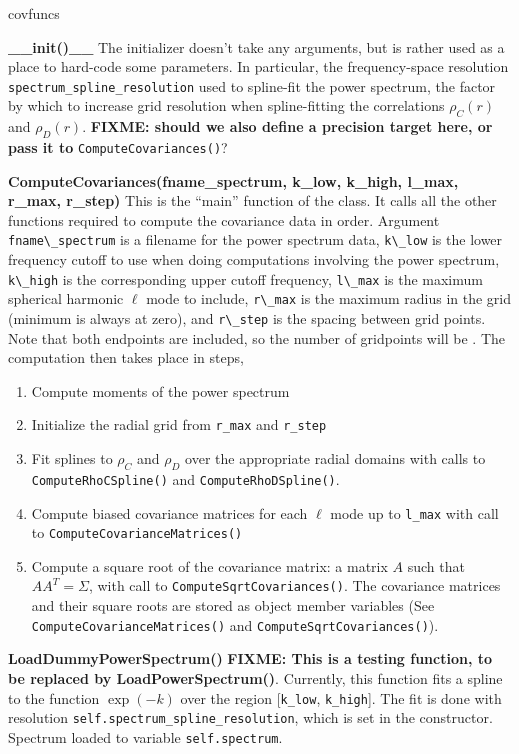 \documentclass[10pt,a4paper]{article}
\begin{document}
\begin{labeling}{covfuncs}
	\item [\textbf{\_\_init()\_\_}] The initializer doesn't take any arguments, but is rather used as a place to hard-code some parameters. In particular, the frequency-space resolution \verb|spectrum_spline_resolution| used to spline-fit the power spectrum, the factor by which to increase grid resolution when spline-fitting the correlations $\rho_C(r)$ and $\rho_D(r)$. \textbf{FIXME: should we also define a precision target here, or pass it to} \verb|ComputeCovariances()|?
	\item [\textbf{ComputeCovariances(fname\_spectrum, k\_low, k\_high, l\_max, r\_max, r\_step)}] This is the ``main'' function of the class. It calls all the other functions required to compute the covariance data in order. Argument \verb|fname\_spectrum| is a filename for the power spectrum data, \verb|k\_low| is the lower frequency cutoff to use when doing computations involving the power spectrum, \verb|k\_high| is the corresponding upper cutoff frequency, \verb|l\_max| is the maximum spherical harmonic $\ell$ mode to include, \verb|r\_max| is the maximum radius in the grid (minimum is always at zero), and \verb|r\_step| is the spacing between grid points. Note that both endpoints are included, so the number of gridpoints will be .
	The computation then takes place in steps,
	\begin{enumerate}
		\item Compute moments of the power spectrum
		\item Initialize the radial grid from \verb|r_max| and \verb|r_step|
		\item Fit splines to $\rho_C$ and $\rho_D$ over the appropriate radial domains with calls to \verb|ComputeRhoCSpline()| and \verb|ComputeRhoDSpline()|.
		\item Compute biased covariance matrices for each $\ell$ mode up to \verb|l_max| with call to \verb|ComputeCovarianceMatrices()|
		\item Compute a square root of the covariance matrix: a matrix $A$ such that $AA^T = \Sigma$, with call to \verb|ComputeSqrtCovariances()|.
	The covariance matrices and their square roots are stored as object member variables (See \verb|ComputeCovarianceMatrices()| and \verb|ComputeSqrtCovariances()|).
	\end{enumerate}

	\item[\textbf{LoadDummyPowerSpectrum()}] \textbf{FIXME: This is a testing function, to be replaced by LoadPowerSpectrum()}.
	Currently, this function fits a spline to the function $\exp(-k)$ over the region [\verb|k_low|, \verb|k_high|]. The fit is done with resolution \verb|self.spectrum_spline_resolution|, which is set in the constructor. Spectrum loaded to variable \verb|self.spectrum|.
	

\end{labeling}
\end{document}
